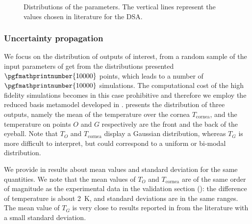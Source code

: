 \begin{figure}
    \centering
    \def\chl{0.6}
    \caption{Distributions of the parameters. The vertical lines represent the values chosen in literature for the DSA.}
    \label{fig:eye:distributions}
\end{figure}


\subsubsection{Uncertainty propagation}

We focus on the distribution of outputs of interest, from a random sample of the input parameters of get from the distributions presented $\pgfmathprintnumber{10000}$ points, which leads to a number of $\pgfmathprintnumber{10000}$ simulations.
The computational cost of the high fidelity simulations becomes in this case prohibitive and therefore we employ the reduced basis metamodel developed in .
 presents the distribution of three outputs, namely the mean of the temperature over the cornea $T_\text{cornea}$,
and the temperature on points $O$ and $G$ respectively are the front and the back of the eyeball.
Note that $T_O$ and $T_\text{cornea}$ display a Gaussian distribution, whereas $T_G$ is more difficult to interpret, but could correspond to a uniform or bi-modal distribution.



We provide in  results about mean values and standard deviation for the same quantities.
We note that the mean values of $T_O$ and $T_\text{cornea}$ are of the same order of magnitude as the experimental data in the validation section (): the difference of temperature is about \qty{2}{\kelvin}, and standard deviations are in the same ranges.
The mean value of $T_G$ is very close to results reported in  from the literature with a small standard deviation.

